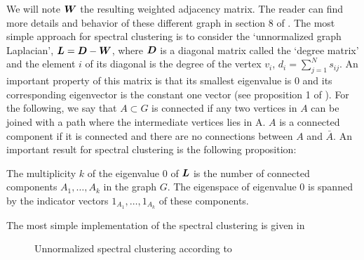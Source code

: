 We will note $\boldsymbol W$ the resulting weighted adjacency matrix. The reader can find more details and behavior of these different graph in section 8 of \citep{Luxburg:2007:TSC:1288822.1288832}. The most simple approach for spectral clustering is to consider the `unnormalized graph Laplacian', $\boldsymbol L=\boldsymbol D-\boldsymbol W$, where $\boldsymbol D$ is a diagonal matrix called the `degree matrix' and the element $i$ of its diagonal is the degree of the vertex $v_i$, $d_i= \sum_{j=1}^Ns_{ij}$. An important property of this matrix is that its smallest eigenvalue is 0 and its corresponding eigenvector is the constant one vector (see proposition 1 of \citep{Luxburg:2007:TSC:1288822.1288832}). For the following, we say that $A \subset G$ is connected if any two vertices in $A$ can be joined with a path where the intermediate vertices lies in A. $A$ is a connected component if it is connected and there are no connections between $A$ and $\bar A$. An important result for spectral clustering is the following proposition:
\begin{proposition}
 The multiplicity $k$ of the eigenvalue 0 of $\boldsymbol L$ is the number of connected components $A_1,\dots,A_k$ in the graph $G$. The eigenspace of eigenvalue 0 is spanned by the indicator vectors $1_{A_1},\dots,1_{A_k}$ of these components.
 \end{proposition}
 The most simple implementation of the spectral clustering is given in 
 \begin{figure}[h]
\begin{center}
   \caption{Unnormalized spectral clustering according to \citep{Luxburg:2007:TSC:1288822.1288832}}
   \label{algo:unnorm_spectr_alg}
\end{center}
\vspace{-15pt}
\end{figure}
